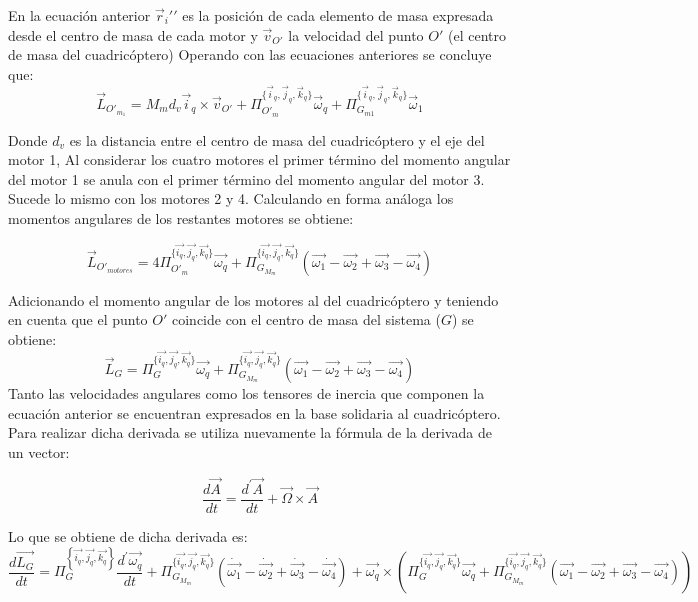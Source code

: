\documentclass[main]{subfiles}
\begin{document}
En la ecuaci\'on anterior $\vec{r}_i\prime\prime$ es la posici\'on de cada elemento de masa expresada desde el centro de masa de cada motor y $\vec{v}_{O\prime}$ la velocidad del punto $O\prime$ (el centro de masa del cuadric\'optero) Operando con las ecuaciones anteriores se concluye que:
\begin{equation}
\vec{L}_{O\prime_{m_1}} = M_m d_v\vec{i}_q\times \vec{v}_{O\prime} +\Pi_{O\prime_m}^{\{\vec{i}_q, \vec{j}_q, \vec{k}_q\}}\vec{\omega}_q+ \Pi_{G_{m1}}^{\{\vec{i}_q, \vec{j}_q, \vec{k}_q\}}\vec{\omega}_1
\end{equation}

Donde $d_v$ es la distancia entre el centro de masa del cuadric\'optero y el eje del motor 1, Al considerar los cuatro motores el primer t\'ermino del momento angular del motor 1 se anula con el primer t\'ermino del momento angular del motor 3. Sucede lo mismo con los motores 2 y 4.
Calculando en forma an\'aloga los momentos angulares de los restantes motores se obtiene:

\begin{equation}
\vec{L}_{O\prime_{motores}}=4\Pi_{O\prime_m}^{\{\vec{i_q}, \vec{j_q}, \vec{k_q}\}}\vec{\omega_q}+\Pi_{G_{M_{m}}}^{\{\vec{i_q}, \vec{j_q}, \vec{k_q}\}}(\vec{\omega_1}-\vec{\omega_2}+\vec{\omega_3}-\vec{\omega_4})
\end{equation}

Adicionando el momento angular de los motores al del cuadric\'optero y teniendo en cuenta que el punto $O\prime$ coincide con el centro de masa del sistema ($G$) se obtiene:
\begin{equation}
\vec{L}_{G}=\Pi_{G}^{\{\vec{i_q}, \vec{j_q}, \vec{k_q}\}}\vec{\omega_q}+\Pi_{G_{M_{m}}}^{\{\vec{i_q}, \vec{j_q}, \vec{k_q}\}}(\vec{\omega_1}-\vec{\omega_2}+\vec{\omega_3}-\vec{\omega_4})
\end{equation}
Tanto las velocidades angulares como los tensores de inercia que componen la ecuaci\'on anterior se encuentran expresados en la base solidaria al cuadric\'optero. Para realizar dicha derivada se utiliza nuevamente la f\'ormula de la derivada de un vector:

\begin{equation}
\frac{d\vec{A}}{dt} =\frac{d^\prime\vec{A}}{dt}+\vec{\Omega}\times\vec{A} 
\end{equation}

Lo que se obtiene de dicha derivada es:
\begin{equation}
\frac{d\vec{L_G}}{dt} = \Pi_{G}^{\left\lbrace\vec{i_q}, \vec{j_q}, \vec{k_q}\right\rbrace}\frac{d^\prime\vec{{\omega}_q}}{dt}+\Pi_{G_{M_{m}}}^{\{\vec{i_q}, \vec{j_q}, \vec{k_q}\}}(\dot{\vec{\omega_1}}-\dot{\vec{\omega_2}}+\dot{\vec{\omega_3}}-\dot{\vec{\omega_4}})
+\vec{\omega_q}\times(\Pi_{G}^{\{\vec{i_q}, \vec{j_q}, \vec{k_q}\}}\vec{\omega_q}+\Pi_{G_{M_{m}}}^{\{\vec{i_q}, \vec{j_q}, \vec{k_q}\}}(\vec{\omega_1}-\vec{\omega_2}+\vec{\omega_3}-\vec{\omega_4}))
\end{equation}
\end{document}

